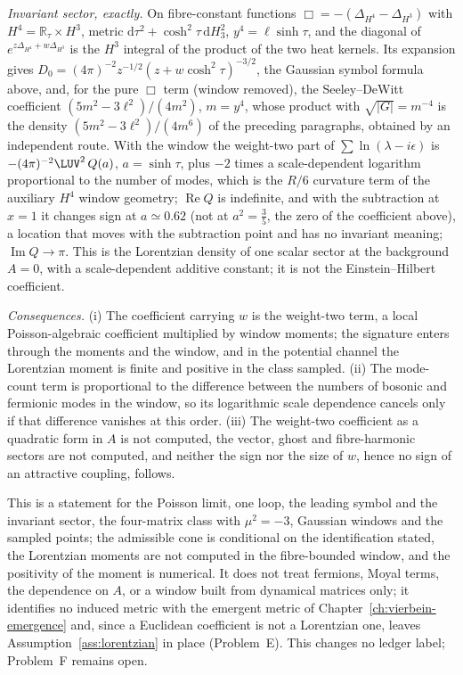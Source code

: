 \emph{Invariant sector, exactly.} On fibre-constant functions \(\Box=-(\Delta_{H^4}-\Delta_{H^3})\) with \(H^4=\mathbb R_\tau\times H^3\), metric \(\mathrm d\tau^2+\cosh^2\tau\,\mathrm dH_3^2\), \(y^4=\ell\sinh\tau\), and the diagonal of \(e^{z\Delta_{H^4}+w\Delta_{H^3}}\) is the \(H^3\) integral of the product of the two heat kernels. Its expansion gives \(D_0=(4\pi)^{-2}z^{-1/2}(z+w\cosh^2\tau)^{-3/2}\), the Gaussian symbol formula above, and, for the pure \(\Box\) term (window removed), the Seeley--DeWitt coefficient \((5m^2-3\ell^2)/(4m^2)\), \(m=y^4\), whose product with \(\sqrt{|G|}=m^{-4}\) is the density \((5m^2-3\ell^2)/(4m^6)\) of the preceding paragraphs, obtained by an independent route. With the window the weight-two part of \(\sum\ln(\lambda-i\epsilon)\) is \(-(4\pi)^{-2}\LUV^2\,Q(a)\), \(a=\sinh\tau\), plus \(-2\) times a scale-dependent logarithm proportional to the number of modes, which is the \(R/6\) curvature term of the auxiliary \(H^4\) window geometry; \(\operatorname{Re}Q\) is indefinite, and with the subtraction at \(x=1\) it changes sign at \(a\simeq0.62\) (not at \(a^2=\tfrac35\), the zero of the coefficient above), a location that moves with the subtraction point and has no invariant meaning; \(\operatorname{Im}Q\to\pi\). This is the Lorentzian density of one scalar sector at the background \(A=0\), with a scale-dependent additive constant; it is not the Einstein--Hilbert coefficient.



\emph{Consequences.} (i) The coefficient carrying \(w\) is the weight-two term, a local Poisson-algebraic coefficient multiplied by window moments; the signature enters through the moments and the window, and in the potential channel the Lorentzian moment is finite and positive in the class sampled. (ii) The mode-count term is proportional to the difference between the numbers of bosonic and fermionic modes in the window, so its logarithmic scale dependence cancels only if that difference vanishes at this order. (iii) The weight-two coefficient as a quadratic form in \(A\) is not computed, the vector, ghost and fibre-harmonic sectors are not computed, and neither the sign nor the size of \(w\), hence no sign of an attractive coupling, follows.



This is a statement for the Poisson limit, one loop, the leading symbol and the invariant sector, the four-matrix class with \(\mu^2=-3\), Gaussian windows and the sampled points; the admissible cone is conditional on the identification stated, the Lorentzian moments are not computed in the fibre-bounded window, and the positivity of the moment is numerical. It does not treat fermions, Moyal terms, the dependence on \(A\), or a window built from dynamical matrices only; it identifies no induced metric with the emergent metric of Chapter~\ref{ch:vierbein-emergence} and, since a Euclidean coefficient is not a Lorentzian one, leaves Assumption~\ref{ass:lorentzian} in place (Problem~E). This changes no ledger label; Problem~F remains open.





